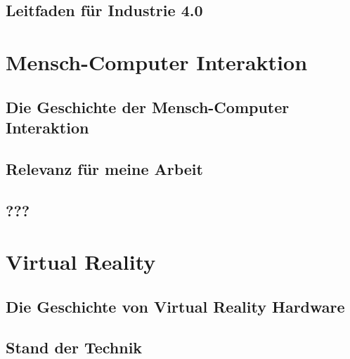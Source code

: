 \lipsum[2]

\subsection{Leitfaden für Industrie 4.0}\label{sec:LeitfadenUmsetung}

\lipsum[2]

\section{Mensch-Computer Interaktion}\label{sec:HCI}

\lipsum[2]

\subsection{Die Geschichte der Mensch-Computer Interaktion}\label{sec:HCIGeschichte}

\lipsum[2]

\subsection{Relevanz für meine Arbeit}\label{sec:RelevanzHCI}

\lipsum[2]

\subsection{???}\label{sec:???}

\lipsum[2]

\section{Virtual Reality}\label{sec:VR}

\lipsum[2]

\subsection{Die Geschichte von Virtual Reality Hardware}\label{sec:VRGeschichte}

\lipsum[2]

\subsection{Stand der Technik}\label{sec:VRStandDerTechnik}

